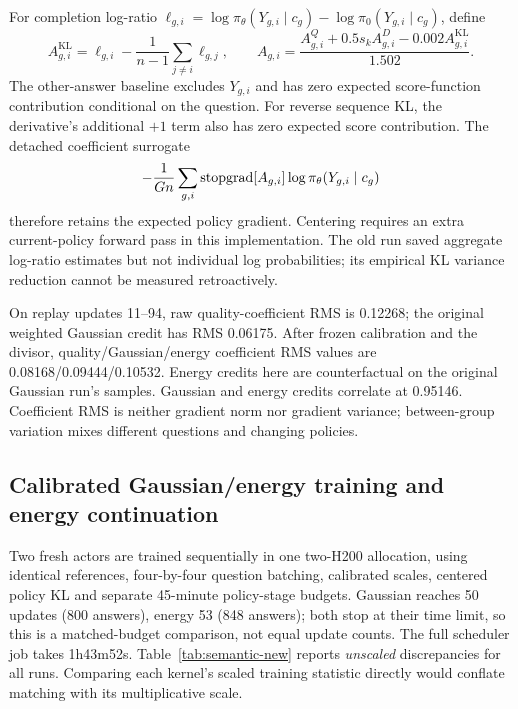 For completion log-ratio $\ell_{g,i}=\log\pi_\theta(Y_{g,i}\mid c_g)
-\log\pi_0(Y_{g,i}\mid c_g)$, define
\begin{equation}
 A^{\mathrm{KL}}_{g,i}=\ell_{g,i}
      -\frac1{n-1}\sum_{j\ne i}\ell_{g,j},\qquad
 A_{g,i}=\frac{A^Q_{g,i}+0.5s_k A^D_{g,i}
                         -0.002 A^{\mathrm{KL}}_{g,i}}{1.502}.
 \label{eq:centeredcredit}
\end{equation}
The other-answer baseline excludes $Y_{g,i}$ and has zero expected
score-function contribution conditional on the question. For reverse
sequence KL, the derivative's additional $+1$ term also has zero
expected score contribution. The detached coefficient surrogate
\begin{equation}
 -\frac{1}{Gn}\sum_{g,i}\operatorname{stopgrad}[A_{g,i}]\log\pi_\theta(Y_{g,i}\mid c_g)
\end{equation}
therefore retains the expected policy gradient. Centering requires an
extra current-policy forward pass in this implementation. The old run
saved aggregate log-ratio estimates but not individual log probabilities;
its empirical KL variance reduction cannot be measured retroactively.

On replay updates 11--94, raw quality-coefficient RMS is 0.12268;
the original weighted Gaussian credit has RMS 0.06175. After frozen
calibration and the divisor, quality/Gaussian/energy coefficient RMS
values are 0.08168/0.09444/0.10532. Energy credits here are
counterfactual on the original Gaussian run's samples. Gaussian and
energy credits correlate at 0.95146. Coefficient RMS is neither gradient
norm nor gradient variance; between-group variation mixes different
questions and changing policies.

\subsection{Calibrated Gaussian/energy training and energy continuation}
Two fresh actors are trained sequentially in one two-H200 allocation,
using identical references, four-by-four question batching, calibrated
scales, centered policy KL and separate 45-minute policy-stage budgets.
Gaussian reaches 50 updates (800 answers), energy 53 (848 answers);
both stop at their time limit, so this is a matched-budget comparison,
not equal update counts. The full scheduler job takes 1h43m52s.
Table~\ref{tab:semantic-new} reports \emph{unscaled} discrepancies for
all runs. Comparing each kernel's scaled training statistic directly
would conflate matching with its multiplicative scale.


